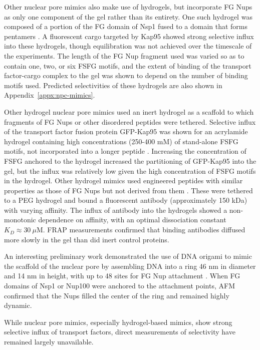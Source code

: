 Other nuclear pore mimics also make use of hydrogels, but incorporate FG Nups as only one component of the gel rather than its entirety.  One such hydrogel was composed of a portion of the FG domain of Nsp1 fused to a domain that forms pentamers \cite{kim15}.  A fluorescent cargo targeted by Kap95 showed strong selective influx into these hydrogels, though equilibration was not achieved over the timescale of the experiments.  The length of the FG Nup fragment used was varied so as to contain one, two, or six FSFG motifs, and the extent of binding of the transport factor-cargo complex to the gel was shown to depend on the number of binding motifs used.  Predicted selectivities of these hydrogels are also shown in Appendix~\ref{appx:npc-mimics}.

Other hydrogel nuclear pore mimics used an inert hydrogel as a scaffold to which fragments of FG Nups or other disordered peptides were tethered.  Selective influx of the transport factor fusion protein GFP-Kap95 was shown for an acrylamide hydrogel containing high concentrations (250-400 mM) of stand-alone FSFG motifs, not incorporated into a longer peptide \cite{friedman16a}.  Increasing the concentration of FSFG anchored to the hydrogel increased the partitioning of GFP-Kap95 into the gel, but the influx was relatively low given the high concentration of FSFG motifs in the hydrogel.  Other hydrogel mimics used engineered peptides with similar properties as those of FG Nups but not derived from them \cite{yang18}.  These were tethered to a PEG hydrogel and bound a fluorescent antibody (approximately 150 kDa) with varying affinity.  The influx of antibody into the hydrogels showed a non-monotonic dependence on affinity, with an optimal dissociation constant $K_D \approx 30~\mu$M.  FRAP measurements confirmed that binding antibodies diffused more slowly in the gel than did inert control proteins.

An interesting preliminary work demonstrated the use of DNA origami to mimic the scaffold of the nuclear pore by assembling DNA into a ring 46 nm in diameter and 14 nm in height, with up to 48 sites for FG Nup attachment \cite{fisher18}.  When FG domains of Nsp1 or Nup100 were anchored to the attachment points, AFM confirmed that the Nups filled the center of the ring and remained highly dynamic.

While nuclear pore mimics, especially hydrogel-based mimics, show strong selective influx of transport factors, direct measurements of selectivity have remained largely unavailable.

